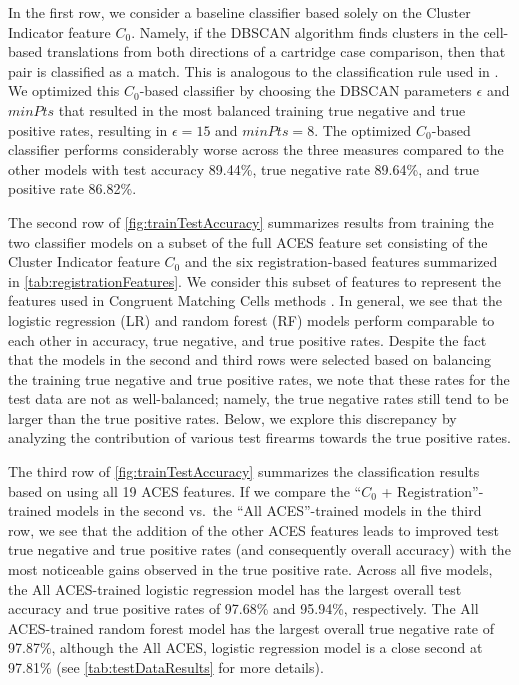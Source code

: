 \documentclass[reprint]{JASA}
\begin{document}
In the first row, we consider a baseline classifier based solely on the
Cluster Indicator feature \(C_0\). Namely, if the DBSCAN algorithm finds
clusters in the cell-based translations from both directions of a
cartridge case comparison, then that pair is classified as a match. This
is analogous to the classification rule used in
\citet{zhang_convergence_2021}. We optimized this \(C_0\)-based
classifier by choosing the DBSCAN parameters \(\epsilon\) and \(minPts\)
that resulted in the most balanced training true negative and true
positive rates, resulting in \(\epsilon = 15\) and \(minPts = 8\). The
optimized \(C_0\)-based classifier performs considerably worse across
the three measures compared to the other models with test accuracy
89.44\%, true negative rate 89.64\%, and true positive rate 86.82\%.

The second row of \autoref{fig:trainTestAccuracy} summarizes results
from training the two classifier models on a subset of the full ACES
feature set consisting of the Cluster Indicator feature \(C_0\) and the
six registration-based features summarized in
\autoref{tab:registrationFeatures}. We consider this subset of features
to represent the features used in Congruent Matching Cells methods
\citep{song_proposed_2013, zhang_convergence_2021}. In general, we see
that the logistic regression (LR) and random forest (RF) models perform
comparable to each other in accuracy, true negative, and true positive
rates. Despite the fact that the models in the second and third rows
were selected based on balancing the training true negative and true
positive rates, we note that these rates for the test data are not as
well-balanced; namely, the true negative rates still tend to be larger
than the true positive rates. Below, we explore this discrepancy by
analyzing the contribution of various test firearms towards the true
positive rates.

The third row of \autoref{fig:trainTestAccuracy} summarizes the
classification results based on using all 19 ACES features. If we
compare the ``\(C_0\) + Registration''-trained models in the second
vs.~the ``All ACES''-trained models in the third row, we see that the
addition of the other ACES features leads to improved test true negative
and true positive rates (and consequently overall accuracy) with the
most noticeable gains observed in the true positive rate. Across all
five models, the All ACES-trained logistic regression model has the
largest overall test accuracy and true positive rates of 97.68\% and
95.94\%, respectively. The All ACES-trained random forest model has the
largest overall true negative rate of 97.87\%, although the All ACES,
logistic regression model is a close second at 97.81\% (see
\autoref{tab:testDataResults} for more details).
\end{document}
